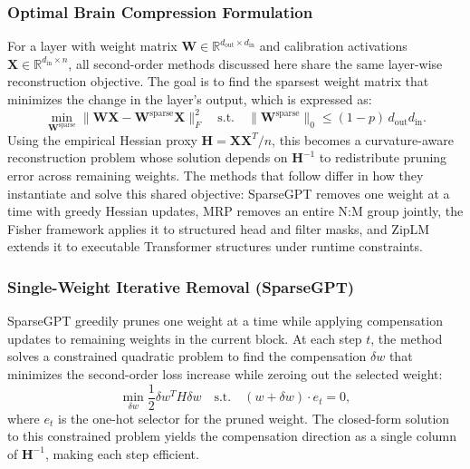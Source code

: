 \subsubsection{Optimal Brain Compression Formulation}

For a layer with weight matrix $\mathbf{W} \in \mathbb{R}^{d_{\text{out}} \times d_{\text{in}}}$ and calibration activations $\mathbf{X} \in \mathbb{R}^{d_{\text{in}} \times n}$, all second-order methods discussed here share the same layer-wise reconstruction objective. The goal is to find the sparsest weight matrix that minimizes the change in the layer's output, which is expressed as:
\begin{equation}
	\min_{\mathbf{W}^{\text{sparse}}}
	\|\mathbf{W}\mathbf{X} - \mathbf{W}^{\text{sparse}}\mathbf{X}\|_F^2
	\quad \text{s.t.} \quad
	\|\mathbf{W}^{\text{sparse}}\|_0 \leq (1-p)\, d_{\text{out}} d_{\text{in}}.
\end{equation}
Using the empirical Hessian proxy $\mathbf{H} = \mathbf{X}\mathbf{X}^T / n$, this becomes a curvature-aware reconstruction problem whose solution depends on $\mathbf{H}^{-1}$ to redistribute pruning error across remaining weights. The methods that follow differ in how they instantiate and solve this shared objective: SparseGPT removes one weight at a time with greedy Hessian updates, MRP removes an entire N:M group jointly, the Fisher framework applies it to structured head and filter masks, and ZipLM extends it to executable Transformer structures under runtime constraints.

\subsubsection{Single-Weight Iterative Removal (SparseGPT)}

SparseGPT \cite{frantar2023sparsegpt} greedily prunes one weight at a time while applying compensation updates to remaining weights in the current block. At each step $t$, the method solves a constrained quadratic problem to find the compensation $\delta w$ that minimizes the second-order loss increase while zeroing out the selected weight:
\begin{equation}\label{eq:srp}
	\min_{\delta w} \frac{1}{2}\delta w^T H \delta w
	\quad\text{s.t.}\quad
	(w+\delta w)\cdot e_t = 0,
\end{equation}
where $e_t$ is the one-hot selector for the pruned weight. The closed-form solution to this constrained problem yields the compensation direction as a single column of $\mathbf{H}^{-1}$, making each step efficient.

